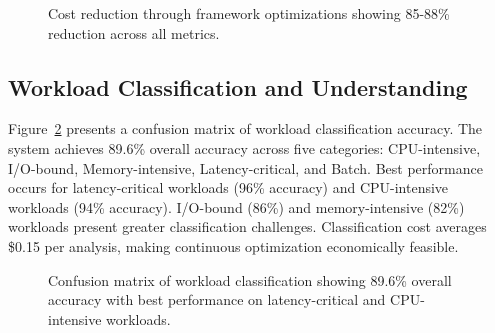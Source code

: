 \begin{figure}[h]
\centering
{}
\caption{Cost reduction through framework optimizations showing 85-88\% reduction across all metrics.}
\label{fig:cost-reduction}
\end{figure}

\subsection{Workload Classification and Understanding}

Figure~\ref{fig:workload-classification} presents a confusion matrix of workload classification accuracy. The system achieves 89.6\% overall accuracy across five categories: CPU-intensive, I/O-bound, Memory-intensive, Latency-critical, and Batch. Best performance occurs for latency-critical workloads (96\% accuracy) and CPU-intensive workloads (94\% accuracy). I/O-bound (86\%) and memory-intensive (82\%) workloads present greater classification challenges. Classification cost averages \$0.15 per analysis, making continuous optimization economically feasible.

\begin{figure}[h]
\centering
{}
\caption{Confusion matrix of workload classification showing 89.6\% overall accuracy with best performance on latency-critical and CPU-intensive workloads.}
\label{fig:workload-classification}
\end{figure}
